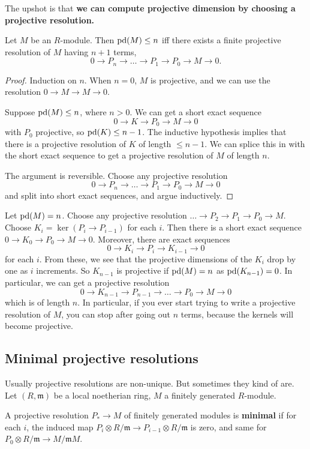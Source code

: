 The upshot is that \textbf{we can compute projective dimension by choosing a
projective resolution.}
\begin{proposition} 
Let $M$ be an $R$-module. Then $\mathrm{pd}(M) \leq n$ iff there exists a finite
projective resolution of $M$ having $n+1$ terms, 
\[ 0 \to P_n \to \dots \to P_1 \to P_0 \to M \to 0.  \]
\end{proposition} 
\begin{proof} 
Induction on $n$. When $n = 0$, $M$ is projective, and we can use the
resolution $0 \to M \to M \to 0$.

Suppose $\mathrm{pd}(M) \leq n$, where $n >0$. We can get a short exact sequence
\[ 0 \to K \to P_0 \to M \to 0  \]
with $P_0$ projective, so $\mathrm{pd}(K) \leq n-1$. The inductive hypothesis implies
that there is a projective resolution of $K$ of length $\leq n-1$. We can
splice this in with the short exact sequence to get a projective resolution of
$M$ of length $n$.

The argument is reversible. Choose any projective resolution
\[  0 \to P_n \to \dots \to P_1 \to P_0 \to M \to 0 \]
and split into short exact sequences, and argue inductively.
\end{proof} 


Let $\mathrm{pd}(M) = n$. Choose any projective resolution $\dots \to P_2 \to P_1 \to
P_0 \to M$. Choose $K_i = \ker(P_i \to P_{i-1})$ for each $i$. 
Then there is a short exact sequence $0 \to K_0 \to P_0 \to M \to 0$. Moreover,
there are exact sequences
\[ 0 \to K_i \to P_i \to K_{i-1} \to 0  \]
for each $i$. From these, we see that the projective dimensions of the $K_i$
drop by one as $i$ increments. So $K_{n-1}$ is projective if $\mathrm{pd}(M) = n$ as
$\mathrm{pd}(K_{n-1})=0$. In particular, we can get a projective resolution
\[ 0 \to K_{n-1} \to P_{n-1} \to \dots \to P_0 \to M \to 0  \]
which is of length $n$. 
In particular, if you ever start trying to write a projective resolution of
$M$, you can stop after going out $n$ terms, because the kernels will become
projective.


\subsection{Minimal projective resolutions}
Usually projective resolutions are non-unique. But sometimes they kind of are.
Let $(R, \mathfrak{m})$ be a local noetherian ring, $M$ a finitely generated $R$-module. 

\begin{definition} 
A projective resolution $P_* \to M$ of finitely generated modules is \textbf{minimal} if for each $i$, the
induced map $P_i \otimes R/\mathfrak{m} \to P_{i-1} \otimes R/\mathfrak{m}$ is
zero, and same for $P_0 \otimes R/\mathfrak{m} \to M/\mathfrak{m}M$.
\end{definition} 

